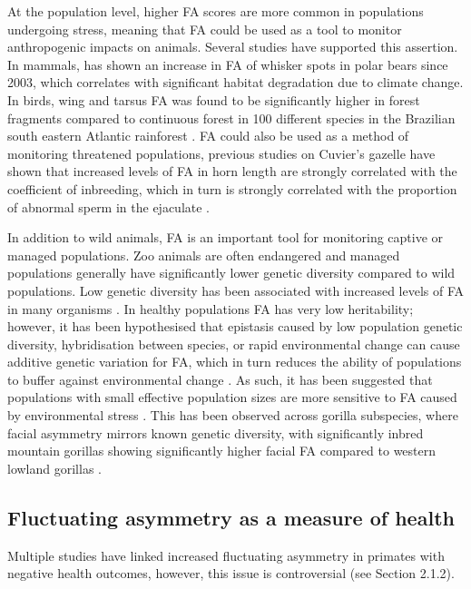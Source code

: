 At the population level, higher FA scores are more common in populations undergoing stress, meaning that FA could be used as a tool to monitor anthropogenic impacts on animals. Several studies have supported this assertion. In mammals, \citet{Kucheravy.2022} has shown an increase in FA of whisker spots in polar bears since 2003, which correlates with significant habitat degradation due to climate change. In birds, wing and tarsus FA was found to be significantly higher in forest fragments compared to continuous forest in 100 different species in the Brazilian south eastern Atlantic rainforest \citep{Anciães.2000}.  FA could also be used as a method of monitoring threatened populations, previous studies on Cuvier's gazelle have shown that increased levels of FA in horn length are strongly correlated with the coefficient of inbreeding, which in turn is strongly correlated with the proportion of abnormal sperm in the ejaculate \citep{Roldan.1998}. 

In addition to wild animals, FA is an important tool for monitoring captive or managed populations. Zoo animals are often endangered and managed populations generally have significantly lower genetic diversity compared to wild populations. Low genetic diversity has been associated with increased levels of FA in many organisms \citep{Leary.1989}. In healthy populations FA has very low heritability; however, it has been hypothesised that epistasis caused by low population genetic diversity, hybridisation between species, or rapid environmental change can cause additive genetic variation for FA, which in turn reduces the ability of populations to buffer against environmental change \citep{Leamy.2005}. As such, it has been suggested that populations with small effective population sizes are more sensitive to FA caused by environmental stress \citep{Knierim.2007}. This has been observed across gorilla subspecies, where facial asymmetry mirrors known genetic diversity, with significantly inbred mountain gorillas showing significantly higher facial FA compared to western lowland gorillas \citep{McGrath.20220bl}.

\subsection{Fluctuating asymmetry as a measure of health}
Multiple studies have linked increased fluctuating asymmetry in primates with negative health outcomes, however, this issue is controversial (see Section 2.1.2). 

